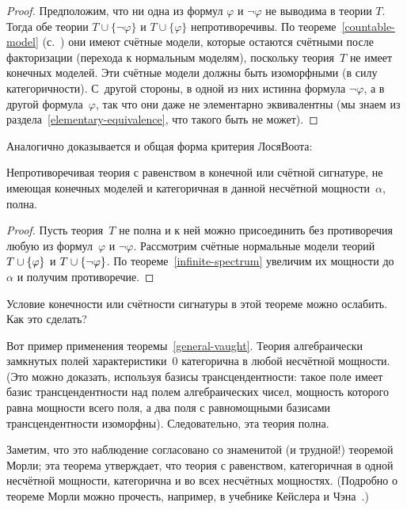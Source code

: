 \begin{proof}
Предположим, что ни одна из формул $\varphi$ и $\lnot\varphi$ не
выводима в теории $T$. Тогда обе теории $T\cup\{\lnot\varphi\}$
и $T\cup\{\varphi\}$ непротиворечивы. По
теореме~\ref{countable-model} (с.~\pageref{countable-model}) они
имеют счётные модели, которые остаются счётными после
факторизации (перехода к нормальным моделям), поскольку
теория~$T$ не имеет конечных моделей. Эти счётные модели должны
быть изоморфными (в силу категоричности). С~другой стороны, в
одной из них истинна формула $\lnot\varphi$, а в другой\т
формула~$\varphi$, так что они даже не элементарно эквивалентны
(мы знаем из раздела~\ref{elementary-equivalence}, что такого
быть не может).
\end{proof}

Аналогично доказывается и общая форма критерия Лося\ч Воота:

\begin{theorem}
%
        \label{general-vaught}%
Непротиворечивая теория с равенством в конечной или счётной
сигнатуре, не имеющая конечных моделей и категоричная в данной
несчётной мощности~$\alpha$, полна.
\end{theorem}

\begin{proof}
Пусть теория~$T$ не полна и к ней можно присоединить без
противоречия любую из формул~$\varphi$ и $\lnot\varphi$.
Рассмотрим счётные нормальные модели теорий
$T\hm\cup\{\varphi\}$ и $T\hm\cup\{\lnot\varphi\}$. По
теореме~\ref{infinite-spectrum} увеличим их мощности до~$\alpha$
и получим противоречие.
\end{proof}

\begin{problem}
Условие конечности или счётности сигнатуры в этой теореме можно
ослабить. Как это сделать?
\end{problem}

Вот пример применения теоремы~\ref{general-vaught}. Теория
алгебраически замкнутых полей характеристики~$0$ категорична в
любой несчётной мощности. (Это можно доказать, используя
базисы трансцендентности: такое поле имеет базис
трансцендентности над полем алгебраических чисел, мощность
которого равна мощности всего поля, а два поля с равномощными
базисами трансцендентности изоморфны). Следовательно, эта теория
полна.

Заметим, что это наблюдение согласовано со знаменитой (и
трудной!) теоремой Морли;%
%
эта теорема утверждает, что теория с равенством,
категоричная в одной несчётной мощности, категорична и во всех
несчётных мощностях. (Подробно о теореме Морли можно прочесть,
например, в учебнике Кейслера
и Чэна~\cite{keisler-chang}.)

